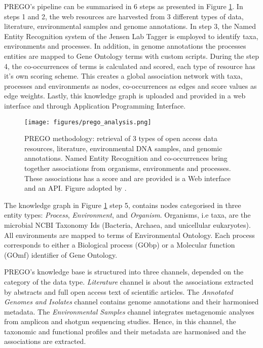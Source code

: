 PREGO's pipeline can be summarised in 6 steps as presented in Figure \ref{fig:prego-pipeline}.
In steps 1 and 2, the web resources are harvested from 3 different types of data,
literature, environmental samples and genome annotations. 
In step 3, the Named Entity Recognition system of the Jensen Lab Tagger is employed \parencite{jensen2016one}
to identify taxa, environments and processes. In addition, in genome annotations
the processes entities are mapped to Gene Ontology terms with custom scripts. 
During the step 4, the co-occurrences of terms is calculated and scored,
each type of resource has it's own scoring scheme. 
This creates a global association network with taxa, processes and environments as 
nodes, co-occurrences as edges and score values as edge weights. 
Lastly, this knowledge graph is uploaded and provided in a web interface 
and through Application Programming Interface.

   \begin{figure}[hbt!]
      \centering
      \texttt{[image: figures/prego\_analysis.png]}
      \caption[PREGO analysis methodology]{
         PREGO methodology: retrieval of 3 types of open access data resources, literature, environmental DNA samples, and genomic annotations. 
         Named Entity Recognition and co-occurrences bring together associations from organisms, environments and processes. 
         These associations has a score and are provided is a Web interface and an API. Figure adopted by \parencite{microorganisms10020293}.
      }
      \label{fig:prego-pipeline}
   \end{figure}

The knowledge graph in Figure \ref{fig:prego-pipeline} step 5, contains
nodes categorised in three entity types: \textit{Process}, \textit{Environment}, and \textit{Organism}. 
Organisms, i.e taxa, are the microbial NCBI Taxonomy Ids (Bacteria, Archaea, and unicellular eukaryotes).
All environments are mapped to terms of Environmental Ontology. 
Each process corresponds to either a Biological process (GObp) or a Molecular function (GOmf) identifier of Gene Ontology. 

PREGO's knowledge base is structured into three channels, depended on the category of the data type.
\textit{Literature} channel is about the associations extracted by abstracts and full open access text of scientific articles.
The \textit{Annotated Genomes and Isolates} channel contains genome annotations and their harmonised metadata.
The \textit{Environmental Samples} channel integrates metagenomic analyses from amplicon and shotgun sequencing studies. 
Hence, in this channel, the taxonomic and functional profiles and their metadata are harmonised and the associations are extracted.


